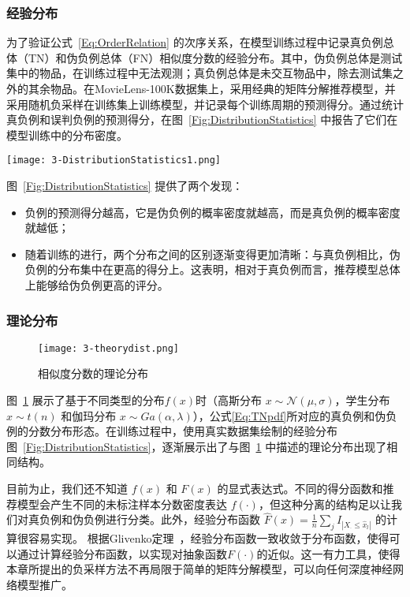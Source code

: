 \subsubsection{经验分布}\label{Appendix:Realdist}
为了验证公式~\eqref{Eq:OrderRelation} 的次序关系，在模型训练过程中记录真负例总体（TN）和伪负例总体（FN）相似度分数的经验分布。其中，伪负例总体是测试集中的物品，在训练过程中无法观测；真负例总体是未交互物品中，除去测试集之外的其余物品。在MovieLens-100K数据集上，采用经典的矩阵分解推荐模型，并采用随机负采样在训练集上训练模型，并记录每个训练周期的预测得分。通过统计真负例和误判负例的预测得分，在图~\ref{Fig:DistributionStatistics} 中报告了它们在模型训练中的分布密度。
\begin{figure*}[h!]
	\centering
	\texttt{[image: 3-DistributionStatistics1.png]}
	\caption{不同训练时点的相似度分数的经验分布}
	\label{Fig:DistributionStatistics}
\end{figure*}
\par
图~\ref{Fig:DistributionStatistics} 提供了两个发现：
\begin{itemize}
\item 负例的预测得分越高，它是伪负例的概率密度就越高，而是真负例的概率密度就越低；
\item 随着训练的进行，两个分布之间的区别逐渐变得更加清晰：与真负例相比，伪负例的分布集中在更高的得分上。这表明，相对于真负例而言，推荐模型总体上能够给伪负例更高的评分。
\end{itemize}

\subsubsection{理论分布}\label{Appendix:Theodist}
\begin{figure}[h!]
	\centering
	\texttt{[image: 3-theorydist.png]}
	\caption{相似度分数的理论分布}
	\label{Fig:TheoryDist}
\end{figure}
图~\ref{Fig:TheoryDist} 展示了基于不同类型的分布$f(x)$时（高斯分布 $x\sim \mathcal{N}(\mu,\sigma)$，学生分布 $x\sim t(n)$ 和伽玛分布 $x\sim Ga(\alpha,\lambda)$），公式\eqref{Eq:TNpdf}所对应的真负例和伪负例的分数分布形态。在训练过程中，使用真实数据集绘制的经验分布图~\ref{Fig:DistributionStatistics}，逐渐展示出了与图~\ref{Fig:TheoryDist} 中描述的理论分布出现了相同结构。

目前为止，我们还不知道 $f(x)$ 和 $F(x)$ 的显式表达式。不同的得分函数和推荐模型会产生不同的未标注样本分数密度表达 $f(\cdot)$，但这种分离的结构足以让我们对真负例和伪负例进行分类。此外，经验分布函数 $\hat F(x)= \frac{1}{n}\sum_j I_{|X_\cdot \leq \hat{x}_l|}$ 的计算很容易实现。 根据Glivenko定理~\cite{glivenko:1933}，经验分布函数一致收敛于分布函数，使得可以通过计算经验分布函数，以实现对抽象函数$F(\cdot)$的近似。这一有力工具，使得本章所提出的负采样方法不再局限于简单的矩阵分解模型，可以向任何深度神经网络模型推广。

